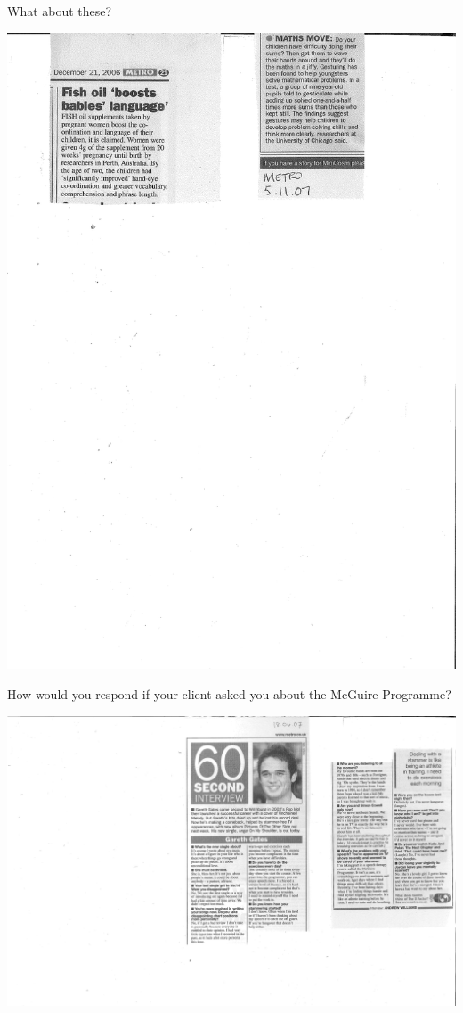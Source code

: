 \documentclass{beamer}
\begin{document}
\begin{frame} {What about these?}
	\begin{center}
	\includegraphics[width=.9\textwidth]{images/metro.pdf}
	\end{center}
\end{frame}

\begin{frame} {How would you respond if your client asked you about the McGuire Programme?}
	\begin{center}
	\includegraphics[width=.8\textwidth]{images/gareth_gates.pdf}
	\end{center}
\end{frame}
\end{document}
